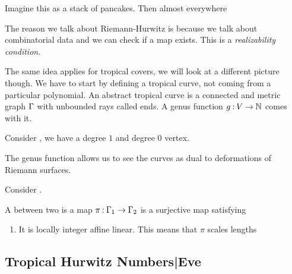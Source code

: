 \documentclass[12pt]{memoir}
\begin{document}
\begin{Ex}
     Imagine this as a stack of pancakes. Then almost everywhere 
\end{Ex}

The reason we talk about Riemann-Hurwitz is because we talk about combinatorial data and we can check if a map exists. This is a \emph{realizability condition}.\par 
The same idea applies for tropical covers, we will look at a different picture though. We have to start by defining a tropical curve, not coming from a particular polynomial. An abstract tropical curve is a connected and metric graph $\Gamma$ with unbounded rays called ends. A genus function $g\mathbin{:} V\to\mathbb{N}$ comes with it.

\begin{Ex}
    Consider , we have a degree $1$ and degree $0$ vertex. 
\end{Ex}

The genus function allows us to see the curves as dual to deformations of Riemann surfaces.

\begin{Ex}
    Consider .
\end{Ex}

\begin{Def}
    A  between two  is a map $\pi\mathbin{:}\Gamma_1\to\Gamma_2$ is a surjective map satisfying 
    \begin{enumerate}
        \item It is locally integer affine linear. This means that $\pi$ scales lengths 
    \end{enumerate}
\end{Def}

\subsection{Tropical Hurwitz Numbers|Eve}
\end{document}
